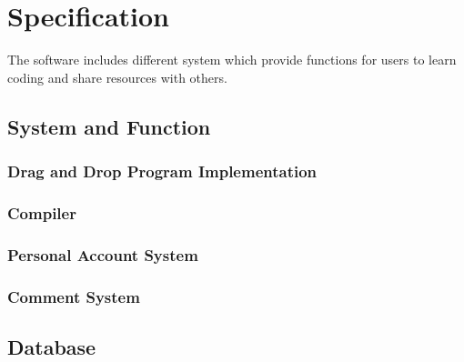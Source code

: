 \chapter{Specification}
The software includes different system which provide functions for users to learn coding and share resources with others.
\section{System and Function}
\subsection{Drag and Drop Program Implementation}
	
\subsection{Compiler}
\subsection{Personal Account System}
	
\subsection{Comment System}
\section{Database}
